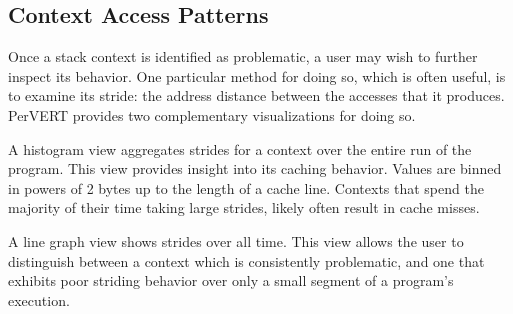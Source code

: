 \documentclass[annual]{acmsiggraph}
\begin{document}
  \subsection{Context Access Patterns}

    Once a stack context is identified as problematic, a user may wish to further inspect its behavior.
    One particular method for doing so, which is often useful, is to examine its stride:
      the address distance between the accesses that it produces.
    PerVERT provides two complementary visualizations for doing so.

    A histogram view aggregates strides for a context over the entire run of the program.
    This view provides insight into its caching behavior.
    Values are binned in powers of 2 bytes up to the length of a cache line.
    Contexts that spend the majority of their time taking large strides, likely often result in cache misses.
    
    A line graph view shows strides over all time.
    This view allows the user to distinguish between a context which is consistently problematic, 
      and one that exhibits poor striding behavior over only a small segment of a program's execution.
\end{document}
